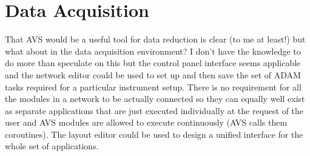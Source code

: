 \section{Data Acquisition}

That AVS would be a useful tool for data reduction is clear (to me at least!)
but what about in the data acquisition environment? I don't have the knowledge
to do more than speculate on this but the control panel interface seems
applicable and the network editor could be used to set up and then save the set
of ADAM tasks required for a particular instrument setup. There is no
requirement for all the modules in a network to be actually connected so they
can equally well exist as separate applications that are just executed
individually at the request of the user and AVS modules are allowed to execute
continuously (AVS calls them coroutines). The layout editor could be used to
design a unified interface for the whole set of applications.


